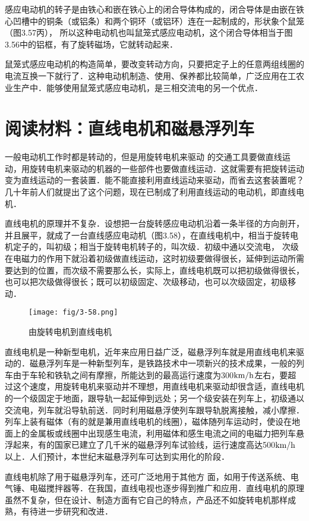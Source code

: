 感应电动机的转子是由铁心和嵌在铁心上的闭合导体构成的，闭合导体是由嵌在铁心凹槽中的铜条（或铝条）和两个铜环（或铝环）连在一起制成的，形状象个鼠笼（图3.57丙），
所以这种电动机也叫鼠笼式感应电动机，这个闭合导体相当于图3.56中的铝框，有了旋转磁场，它就转动起来．

鼠笼式感应电动机的构造简单，要改变转动方向，只要把定子上的任意两组线圈的电流互换一下就行了．这种电动机制造、使用、保养都比较简单，广泛应用在工农业生产中．能够使用鼠笼式感应电动机，是三相交流电的另一个优点．

\section*{阅读材料：直线电机和磁悬浮列车}

一般电动机工作时都是转动的，但是用旋转电机来驱动
的交通工具要做直线运动，用旋转电机来驱动的机器的一些部件也要做直线运动．这就需要有把旋转运动变为直线运动的一套装置．能不能直接利用直线运动来驱动，而省去这套装置呢？几十年前人们就提出了这个问题，现在已制成了利用直线运动的电动机，即直线电机．

直线电机的原理并不复杂．设想把一台旋转感应电动机沿着一条半径的方向剖开，并且展平，就成了一台直线感应电动机（图3.58），在直线电机中，相当于旋转电机定子的，叫初级；相当于旋转电机转子的，叫次级．初级中通以交流电，
次级在电磁力的作用下就沿着初级做直线运动，这时初级要做得很长，延伸到运动所需要达到的位置，而次级不需要那么长，实际上，直线电机既可以把初级做得很长，也可以把次级做得很长；既可以初级固定、次级移动，也可以次级固定，初级移动．
\begin{figure}[htp]\centering
\texttt{[image: fig/3-58.png]}
\caption{由旋转电机到直线电机}
\end{figure}

直线电机是一种新型电机，近年来应用日益广泛，磁悬浮列车就是用直线电机来驱动的．磁悬浮列车是一种新型列车，是铁路技术中一项新兴的技术成果，一般的列车由于车轮和铁轨之间有摩擦，所能达到的最高运行速度为300$\text{km}/\text{h}$左右，要超过这个速度，用旋转电机来驱动并不理想，用直线电机来驱动却很含适，直线电机的一个级固定于地面，跟导轨一起延伸到远处；另一个级安装在列车上，初级通以交流电，列车就沿导轨前送．同时利用磁悬浮使列车跟导轨脱离接触，减小摩擦．列车上装有磁体（有的就是兼用直线电机的线圈），磁体随列车运动时，使设在地面上的金属板或线圈中出现感生电流，利用磁体和感生电流之间的电磁力把列车悬浮起来，有的国家已建立了几千米的磁悬浮列车试验线，运行速度高达500$\text{km}/\text{h}$以上．人们预计，本世纪末磁悬浮列车可达到实用化的阶段．

直线电机除了用于磁悬浮列车，还可广泛地用于其他方
面，如用于传送系统、电气锤、电磁搅拌器等．在我国，直线电视也逐步得到推广和应用．直线电机的原理虽然不复杂，但在设计、制造方面有它自己的特点，产品还不如旋转电机那样成熟，有待进一步研究和改进．

